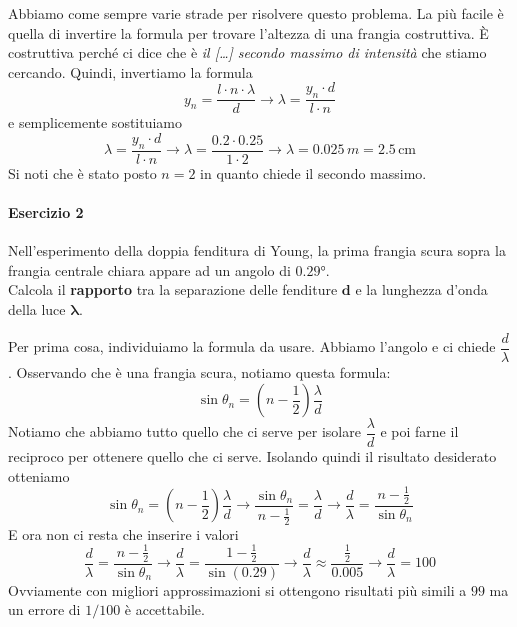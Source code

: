 Abbiamo come sempre varie strade per risolvere questo problema. La più facile è quella di invertire
la formula per trovare l'altezza di una frangia costruttiva. È costruttiva perché ci dice che è
\emph{il [\ldots] secondo massimo di intensità} che stiamo cercando. Quindi, invertiamo la formula
\begin{equation*}
  y_n = \frac{l\cdot n\cdot\lambda}{d} \rightarrow \lambda = \frac{y_n\cdot d}{l\cdot n}
\end{equation*}
e semplicemente sostituiamo
\begin{equation*}
  \lambda = \frac{y_n\cdot d}{l\cdot n} \rightarrow \lambda = \frac{0.2\cdot0.25}{1\cdot2} \rightarrow
  \lambda = \boxed{0.025\,m} = \boxed{2.5\,\text{cm}}
\end{equation*}
Si noti che è stato posto $n=2$ in quanto chiede il secondo massimo.

\paragraph{Esercizio 2}
Nell'esperimento della doppia fenditura di Young, la prima frangia scura sopra la frangia centrale 
chiara appare ad un angolo di $\ang{0.29}$.\\
Calcola il \textbf{rapporto} tra la separazione delle fenditure $\boldsymbol{d}$ e la lunghezza 
d'onda della luce $\boldsymbol{\lambda}$.
\divisor

Per prima cosa, individuiamo la formula da usare. Abbiamo l'angolo e ci chiede $\dfrac{d}{\lambda}$.
Osservando che è una frangia scura, notiamo questa formula:
\begin{equation*}
  \sin\theta_n = \left(n-\frac{1}{2}\right)\frac{\lambda}{d}
\end{equation*}
Notiamo che abbiamo tutto quello che ci serve per isolare $\dfrac{\lambda}{d}$ e poi farne il 
reciproco per ottenere quello che ci serve. Isolando quindi il risultato desiderato otteniamo
\begin{equation*}
  \sin\theta_n = \left(n-\frac{1}{2}\right)\frac{\lambda}{d} \rightarrow
  \frac{\sin\theta_n}{n-\frac{1}{2}} = \frac{\lambda}{d} \rightarrow
  \frac{d}{\lambda} = \frac{n-\frac{1}{2}}{\sin\theta_n}
\end{equation*}
E ora non ci resta che inserire i valori
\begin{equation*}
  \frac{d}{\lambda} = \frac{n-\frac{1}{2}}{\sin\theta_n} \rightarrow
  \frac{d}{\lambda} = \frac{1-\frac{1}{2}}{\sin(0.29)} \rightarrow
  \frac{d}{\lambda} \approx \frac{\frac{1}{2}}{0.005} \rightarrow
  \frac{d}{\lambda} = \boxed{100}
\end{equation*}
Ovviamente con migliori approssimazioni si ottengono risultati più simili a $99$ ma un errore di
$1/100$ è accettabile.

